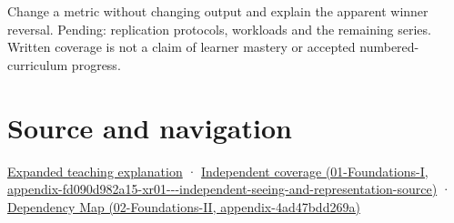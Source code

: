 Change a metric without changing output and explain the apparent winner reversal. Pending: replication protocols, workloads and the remaining series. Written coverage is not a claim of learner mastery or accepted numbered-curriculum progress.

\section{Source and navigation}\label{appendix-65788587ef78-source-and-navigation}

\href{Continuous\%20Notes/University\%20-\%20Worlds,\%20Images\%20and\%20Inference\%20-\%20Graphics,\%20Vision\%20and\%20Photography\#Make\%20the\%20mathematics\%20operational\%20without\%20pretending\%20to\%20run\%20a\%20human\%20study}{Expanded teaching explanation} · \href{../01-Foundations-I/main.pdf\#nameddest=appendix-fd090d982a15-xr01---independent-seeing-and-representation-source}{Independent coverage (01-Foundations-I, appendix-fd090d982a15-xr01-\/-\/-independent-seeing-and-representation-source)} · \href{../02-Foundations-II/main.pdf\#nameddest=appendix-4ad47bdd269a}{Dependency Map (02-Foundations-II, appendix-4ad47bdd269a)}
